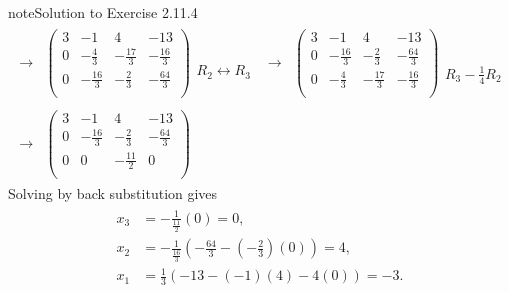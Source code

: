 \documentclass[letterpaper,10pt,english]{jupyterBook}
\begin{document}
\begin{sphinxadmonition}{note}{Solution to Exercise 2.11.4}
\begin{equation*}
\begin{split}
\begin{align*}
    \longrightarrow 
    & \left( \begin{array}{ccc|c} 
         3 & -1 & 4 & -13 \\ 
         0 & - \frac{4}{3} & - \frac{17}{3} & - \frac{16}{3} \\ 
         0 & - \frac{16}{3} & - \frac{2}{3} & - \frac{64}{3} \\ 
    \end{array} \right) 
    \begin{array}{l} \phantom{x} \\ \phantom{x} \\ R_{2} \leftrightarrow R_{3} \\ \end{array} & 
    \longrightarrow 
    & \left( \begin{array}{ccc|c} 
         3 & -1 & 4 & -13 \\ 
         0 & - \frac{16}{3} & - \frac{2}{3} & - \frac{64}{3} \\ 
         0 & - \frac{4}{3} & - \frac{17}{3} & - \frac{16}{3} \\ 
    \end{array} \right) 
    \begin{array}{l} \phantom{x} \\ \phantom{x} \\ R_{3} - \frac{1}{4} R_{2} \end{array} \\ \\ 
    \longrightarrow 
    & \left( \begin{array}{ccc|c} 
         3 & -1 & 4 & -13 \\ 
         0 & - \frac{16}{3} & - \frac{2}{3} & - \frac{64}{3} \\ 
         0 & 0 & - \frac{11}{2} & 0 \\ 
    \end{array} \right) 
\end{align*} \end{split}
\end{equation*}
\sphinxAtStartPar
Solving by back substitution gives
\begin{equation*}
\begin{split} \begin{align*} 
    x_{3} &=  - \frac{1}{\frac{11}{2}} \left( 0 \right) = 0, \\ 
    x_{2} &=  - \frac{1}{\frac{16}{3}} \left( - \frac{64}{3} - \left( - \frac{2}{3} \right) \left( 0 \right) \right) = 4, \\ 
    x_{1} &=  \frac{1}{3} \left( -13 - \left( -1 \right) \left( 4 \right) - 4 \left( 0 \right) \right) = -3. 

\end{align*}
\end{split}
\end{equation*}
\end{sphinxadmonition}
\end{document}
